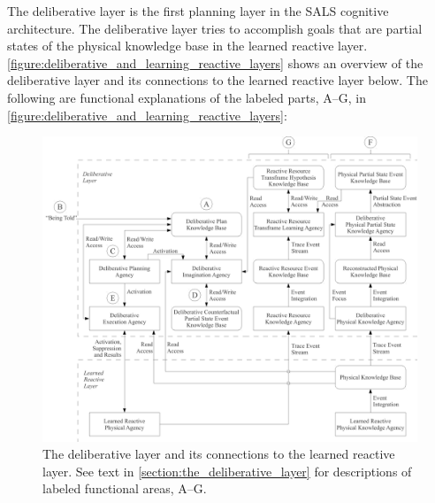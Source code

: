 The deliberative layer is the first planning layer in the SALS
cognitive architecture.  The deliberative layer tries to accomplish
goals that are partial states of the physical knowledge base in the
learned reactive layer.
{\mbox{\autoref{figure:deliberative_and_learning_reactive_layers}}}
shows an overview of the deliberative layer and its connections to the
learned reactive layer below.  The following are functional
explanations of the labeled parts, A--G, in
{\mbox{\autoref{figure:deliberative_and_learning_reactive_layers}}}:
\begin{figure}
\hspace{-3cm}\includegraphics[width=16cm]{gfx/deliberative_and_learned_reactive_layers}
\caption[The deliberative layer and its connections to the learned
  reactive layer.]{The deliberative layer and its connections to the
  learned reactive layer.  See text in
  {\mbox{\autoref{section:the_deliberative_layer}}} for descriptions
  of labeled functional areas, A--G.}
\label{figure:deliberative_and_learning_reactive_layers}
\end{figure}
